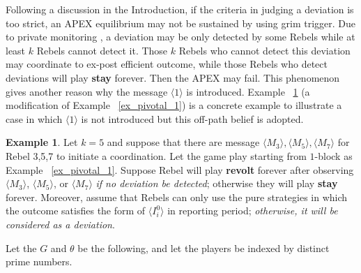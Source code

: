\documentclass[12pt,letterpaper]{article}
\theoremstyle{definition}
\newtheorem{example}{Example}[section]
\theoremstyle{remark}
\theoremstyle{claim}
\begin{document}
Following a discussion in the Introduction, if the criteria in judging a deviation is too strict, an APEX equilibrium may not be sustained by using grim trigger. Due to private monitoring , a deviation may be only detected by some Rebels while at least $k$ Rebels cannot detect it. Those $k$ Rebels who cannot detect this deviation may coordinate to ex-post efficient outcome, while those Rebels who detect deviations will play \textbf{stay} forever. Then the APEX may fail. This phenomenon gives another reason why the message $\langle 1 \rangle$ is introduced. Example ~\ref{ex_deviation} (a modification of Example ~\ref{ex_pivotal_1}) is a concrete example to illustrate a case in which $\langle 1 \rangle$ is not introduced but this off-path belief is adopted. 

\begin{example}\label{ex_deviation}
Let $k=5$ and suppose that there are message $\langle M_3 \rangle,\langle M_5 \rangle, \langle M_7 \rangle$ for Rebel 3,5,7 to initiate a coordination. Let the game play starting from $1$-block as Example ~\ref{ex_pivotal_1}. Suppose Rebel will play \textbf{revolt} forever after observing $\langle M_3 \rangle$, $\langle M_5 \rangle$, or $\langle M_7 \rangle$ \textit{if no deviation be detected}; otherwise they will play \textbf{stay} forever. Moreover, assume that Rebels can only use the pure strategies in which the outcome satisfies the form of $\langle I^0_i \rangle$ in reporting period; \textit{otherwise, it  will be considered as a deviation}. 

Let the $G$ and $\theta$ be the following, and let the players be indexed by distinct prime numbers.

\begin{center}


\end{center}




\end{example}
\end{document}
